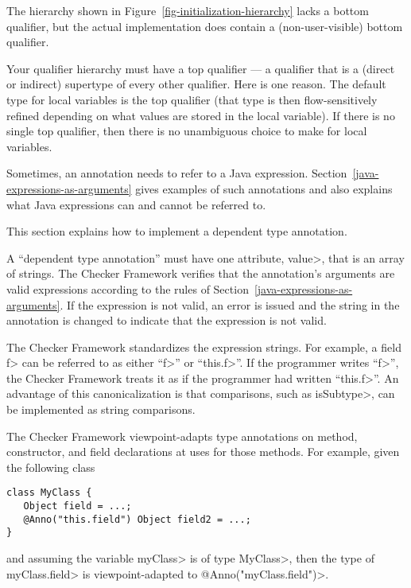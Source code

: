 The hierarchy shown in Figure~\ref{fig-initialization-hierarchy} lacks
a bottom qualifier, but the actual implementation does contain a (non-user-visible) bottom qualifier.


Your qualifier hierarchy must have a top qualifier
--- a qualifier that is a (direct or indirect) supertype of every other
qualifier.
Here is one reason.
The default type for local variables is the top
qualifier (that type is then flow-sensitively
refined depending on what values are stored in the local variable).
If there is no single top qualifier, then there is no
unambiguous choice to make for local variables.



Sometimes, an annotation needs to refer to a Java expression.
Section~\ref{java-expressions-as-arguments} gives examples of such
annotations and also explains what Java expressions can and cannot be
referred to.

This section explains how to implement a dependent type annotation.

A ``dependent type annotation''
must have one attribute, \<value>, that is an
array of strings.  The Checker Framework verifies that the annotation's
arguments are valid expressions according to the rules of
Section~\ref{java-expressions-as-arguments}.  If
the expression is not valid, an error is issued and the string in the
annotation is changed to indicate that the expression is not valid.

The Checker Framework standardizes the expression strings.  For example, a
field \<f> can be referred to as either ``\<f>'' or ``\<this.f>''.  If the
programmer writes ``\<f>'', the Checker Framework treats it
as if the programmer had written ``\<this.f>''.
An advantage of this canonicalization is
that comparisons, such as \<isSubtype>, can be implemented as string comparisons.

The Checker Framework viewpoint-adapts type annotations on method, constructor,
and field declarations at uses for those methods.  For example, given the
following class

\begin{Verbatim}
class MyClass {
   Object field = ...;
   @Anno("this.field") Object field2 = ...;
}
\end{Verbatim}
and assuming the variable \<myClass> is of type \<MyClass>, then the type of
\<myClass.field> is viewpoint-adapted to \<@Anno("myClass.field")>.

